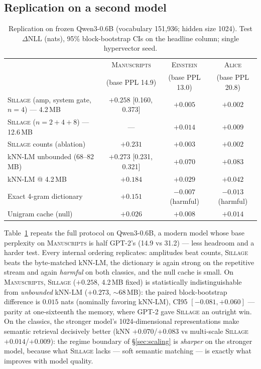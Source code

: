 \documentclass[11pt]{article}
\newcommand{\sillage}{\textsc{Sillage}}
\newcommand{\dnll}{\Delta\mathrm{NLL}}
\newcommand{\ci}[2]{{\footnotesize[#1,\,#2]}}
\begin{document}
\subsection{Replication on a second model}\label{sec:qwen}

\begin{table}[t]
\centering\small
\caption{Replication on frozen Qwen3-0.6B (vocabulary 151{,}936; hidden size 1024). Test $\dnll$ (nats), 95\% block-bootstrap CIs on the headline column; single hypervector seed.}
\label{tab:qwen}
\begin{tabular}{@{}lccc@{}}
\toprule
& \textsc{Manuscripts} & \textsc{Einstein} & \textsc{Alice}\\
& (base PPL 14.9) & (base PPL 13.0) & (base PPL 20.8)\\
\midrule
\sillage{} (amp, system gate, $n{=}4$) --- 4.2\,MB & $+0.258$ \ci{0.160}{0.373} & $+0.005$ & $+0.002$\\
\sillage{} ($n{=}2{+}4{+}8$) --- 12.6\,MB & --- & $+0.014$ & $+0.009$\\
\sillage{} counts (ablation) & $+0.231$ & $+0.003$ & $+0.002$\\
kNN-LM unbounded (68--82\,MB) & $\mathbf{+0.273}$ \ci{0.231}{0.321} & $\mathbf{+0.070}$ & $\mathbf{+0.083}$\\
kNN-LM @ 4.2\,MB & $+0.184$ & $+0.029$ & $+0.042$\\
Exact 4-gram dictionary & $+0.151$ & $-0.007$ (harmful) & $-0.013$ (harmful)\\
Unigram cache (null) & $+0.026$ & $+0.008$ & $+0.014$\\
\bottomrule
\end{tabular}
\end{table}

Table~\ref{tab:qwen} repeats the full protocol on Qwen3-0.6B, a modern model whose base perplexity on \textsc{Manuscripts} is half GPT-2's (14.9 vs 31.2) --- less headroom and a harder test. Every internal ordering replicates: amplitudes beat counts, \sillage{} beats the byte-matched kNN-LM, the dictionary is again strong on the repetitive stream and again \emph{harmful} on both classics, and the null cache is small. On \textsc{Manuscripts}, \sillage{} ($+0.258$, 4.2\,MB fixed) is statistically indistinguishable from \emph{unbounded} kNN-LM ($+0.273$, $\sim$68\,MB): the paired block-bootstrap difference is $0.015$ nats (nominally favoring kNN-LM), CI95 $[-0.081, +0.060]$ --- parity at one-sixteenth the memory, where GPT-2 gave \sillage{} an outright win. On the classics, the stronger model's 1024-dimensional representations make semantic retrieval decisively better (kNN $+0.070$/$+0.083$ vs multi-scale \sillage{} $+0.014$/$+0.009$): the regime boundary of \S\ref{sec:scaling} is \emph{sharper} on the stronger model, because what \sillage{} lacks --- soft semantic matching --- is exactly what improves with model quality.
\end{document}
